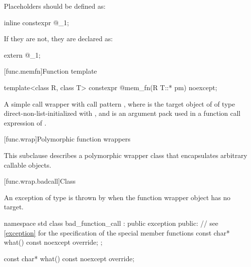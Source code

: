 \pnum
Placeholders should be defined as:
\begin{codeblock}
inline constexpr @\unspec@ _1{};
\end{codeblock}
If they are not, they are declared as:
\begin{codeblock}
extern @\unspec@ _1;
\end{codeblock}%

[func.memfn]{Function template }%

\begin{indexed}{
%
}
\begin{itemdecl}
template<class R, class T> constexpr @\unspec@ mem_fn(R T::* pm) noexcept;
\end{itemdecl}
\end{indexed}

\begin{itemdescr}
\pnum
\returns
A simple call wrapper 
with call pattern , where
 is the target object of  of type 
direct-non-list-initialized with , and
 is an argument pack
used in a function call expression of .
\end{itemdescr}

[func.wrap]{Polymorphic function wrappers}%

\pnum
This subclause describes a polymorphic wrapper class that
encapsulates arbitrary callable objects.

[func.wrap.badcall]{Class }%
%

\pnum
An exception of type  is thrown by
when the function wrapper object has no target.

\begin{codeblock}
namespace std {
  class bad_function_call : public exception {
  public:
    // see \ref{exception} for the specification of the special member functions
    const char* what() const noexcept override;
  };
}
\end{codeblock}

%
\begin{itemdecl}
const char* what() const noexcept override;
\end{itemdecl}

